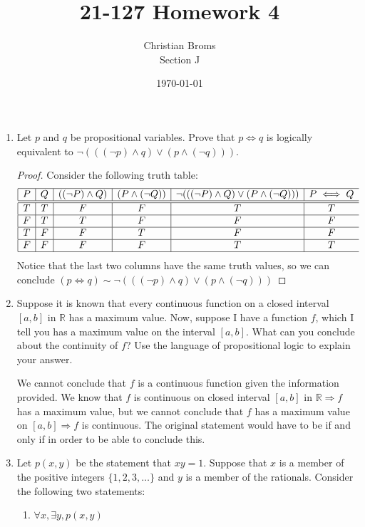\documentclass[12pt]{article}
\newcommand{\R}{\mathbb{R}}
\begin{document}
\title{21-127 Homework 4}
\author{Christian Broms \\ Section J}
\date{\today}
\maketitle

\begin{enumerate}

\item Let $p$ and $q$ be propositional variables. Prove that $p\iff q$ is logically equivalent to $\neg\left( ((\neg p)\wedge q)\vee (p\wedge (\neg q))  \right)$.

\begin{proof} Consider the following truth table:
\begin{displaymath}
\begin{array}{|c|c|c|c|c|c}\hline
P & Q & ((\neg P) \wedge Q) & (P \wedge (\neg Q))& \neg(((\neg P) \wedge Q) \vee (P \wedge (\neg Q))) & P \iff Q\\\hline\hline
T & T & F & F & T & T\\\hline
F & T & T & F & F & F\\\hline
T & F & F & T & F & F\\\hline
F & F & F & F & T & T\\\hline
\end{array}
\end{displaymath}
Notice that the last two columns have the same truth values, so we can conclude $(p\iff q) \sim \neg\left( ((\neg p)\wedge q)\vee (p\wedge (\neg q))  \right)$ 
\end{proof}

\item Suppose it is known that every continuous function on a closed interval $[a,b]$ in $\R$ has a maximum value. Now, suppose I have a function $f$, which I tell you has a maximum value on the interval $[a,b]$. What can you conclude about the continuity of $f$? Use the language of propositional logic to explain your answer.

We cannot conclude that $f$ is a continuous function given the information provided. We know that $f$ is continuous on closed interval $[a, b]$ in $\R \Rightarrow f$ has a maximum value, but we cannot conclude that $f$ has a maximum value on $[a, b] \Rightarrow f$ is continuous. The original statement would have to be if and only if in order to be able to conclude this. 

\item Let $p(x, y)$ be the statement that $xy=1$. Suppose that $x$ is a member of the positive integers $\{1, 2, 3, \dots\}$ and $y$ is a member of the rationals. Consider the following two statements:
\begin{enumerate}
\item $\forall x, \exists y, p(x,y)$


\end{enumerate}
\end{enumerate}
\end{document}
